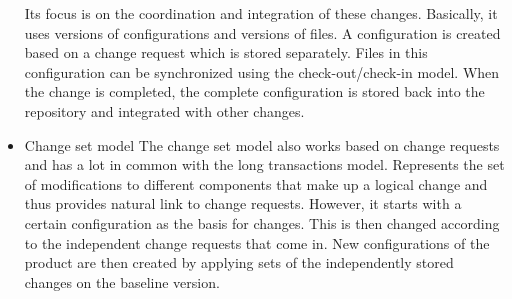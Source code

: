 \begin{itemize}
    Its focus is on the coordination and integration of these changes. Basically, it uses versions of configurations and versions of files.
    A configuration is created based on a change request which is stored separately. Files in this configuration can be synchronized using the check-out/check-in model.
    When the change is completed, the complete configuration is stored back into the repository and integrated with other changes.
    \item Change set model
    The change set model also works based on change requests and has a lot in common with the long transactions model. Represents the set of modifications to different components that make up
    a logical change and thus provides natural link to change requests. However, it starts with a certain configuration as the basis for changes.
    This is then changed according to the independent change requests that come in.
    New configurations of the product are then created by applying sets of the independently stored changes on the baseline version.
\end{itemize}
